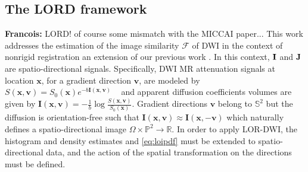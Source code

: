 \documentclass[twocolumn]{svjour3}
\newcommand{\francois}[1]{{\color{red}\textbf{Francois: }#1}}
\newcommand{\francois}[1]{{}}
\begin{document}
\subsection{The LORD framework}
\francois{LORD! of course some mismatch with the MICCAI paper...}
This work addresses the estimation of the image similarity $\mathcal F$ of DWI in the
context of nonrigid registration an extension of our previous work
\cite{jensen2015locally}.
In this context, ${\bf I}$ and ${\bf J}$ are spatio-directional signals. Specifically, DWI MR
attenuation signals at location $\bm x$, for a gradient direction $\bm v$, are modeled by
$S(\bm x,\bm v) = S_0(\bm x) e^{-b\bm I(\bm x,\bm v)}$ \ \cite{tao2006method} and apparent
diffusion coefficients volumes are given by
$\bm I(\bm x,\bm v)=-\frac{1}{b}\log\frac{S(\bm x,\bm v)}{S_0(\bm x)}$. Gradient
directions $\bm v$ belong to $\mathbb S^2$ but the diffusion is orientation-free such that
$\bm I(\bm x,\bm v)\approx \bm I(\bm x,-\bm v)$ which naturally defines a
spatio-directional image $\Omega\times \mathbb P^2 \to \mathbb R$.  In order to apply
LOR-DWI, the histogram and density estimates  and \cref{eq:loipdf} must be
extended to spatio-directional data, and the action of the spatial transformation on the
directions must be defined.
\end{document}
